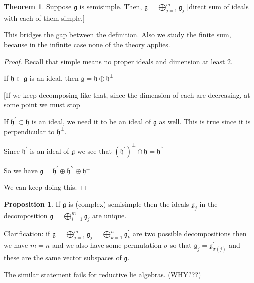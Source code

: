 \documentclass{article}
\theoremstyle{definition}
\newtheorem{theorem}{Theorem}
\newtheorem{proposition}{Proposition}
\begin{document}
\begin{theorem}
    Suppose \(\mathfrak{g} \) is semisimple. Then, \(\mathfrak{g} =\bigoplus_{j=1}^{m} \mathfrak{g} _{j} \) [direct sum of ideals with each of them simple.] 

\end{theorem}

This bridges the gap between the definition. Also we study the finite sum, because in the infinite case none of the theory applies.

\begin{proof}
    Recall that simple means no proper ideals and dimension at least \(2\).
    
    If \(\mathfrak{h} \subset \mathfrak{g} \) is an ideal, then \(\mathfrak{g} =\mathfrak{h} \oplus \mathfrak{h} ^{\perp} \)

    [If we keep decomposing like that, since the dimension of each are decreasing, at some point we must stop]

    If \(\mathfrak{h}^{\prime} \subset \mathfrak{h} \) is an ideal, we need it to be an ideal of \(\mathfrak{g} \) as well. This is true since it is perpendicular to \(\mathfrak{h} ^{\perp} \).

    Since \(\mathfrak{h}^\prime\) is an ideal of \(\mathfrak{g} \) we see that \((\mathfrak{h}^{\prime}) ^{\perp}\cap \mathfrak{h} =\mathfrak{h}^{\prime\prime}   \) 

    So we have \(\mathfrak{g} =\mathfrak{h}^{\prime} \oplus \mathfrak{h}^{\prime\prime} \oplus \mathfrak{h}^{\perp}  \) 

    We can keep doing this.

\end{proof}

\begin{proposition}
    If \(\mathfrak{g} \) is (complex) semisimple then the ideals \(\mathfrak{g}_{j} \) in the decomposition \(\mathfrak{g}=\bigoplus_{i=1}^{m} \mathfrak{g}_{j}\) are unique.  
\end{proposition}

Clarification: if \(\mathfrak{g}=\bigoplus_{j=1}^{m} \mathfrak{g}_{j} =\bigoplus_{k=1}^{n} \mathfrak{g}^{\prime} _{k}   \) are two possible decompositions then we have \(m=n\) and we also have some permutation \(\sigma \) so that \(\mathfrak{g} _{j} =\mathfrak{g}^{\prime\prime}_{\sigma (j)}\) and these are the same vector subspaces of \(\mathfrak{g} \).

The similar statement fails for reductive lie algebras. (WHY???)
\end{document}

